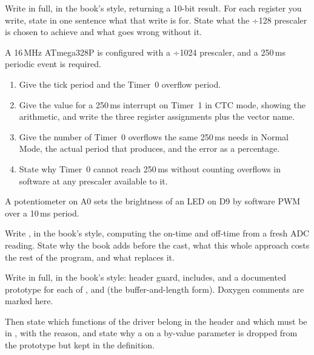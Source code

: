 \label{exb:q:4}

 Write  in full, in the book's style, returning a 10-bit
result. For each register you write, state in one sentence what that write is for. State what the
÷128 prescaler is chosen to achieve and what goes wrong without it. 

 A 16\,MHz ATmega328P is configured with a ÷1024 prescaler, and a 250\,ms periodic event is
required.
\begin{enumerate}
  \item Give the tick period and the Timer~0 overflow period.
  \item Give the  value for a 250\,ms interrupt on Timer~1 in CTC mode, showing the
    arithmetic, and write the three register assignments plus the vector name.
  \item Give the number of Timer~0 overflows the same 250\,ms needs in Normal Mode, the actual
    period that produces, and the error as a percentage.
  \item State why Timer~0 cannot reach 250\,ms without counting overflows in software at any
    prescaler available to it.
\end{enumerate}
\noindent{}

 A potentiometer on A0 sets the brightness of an LED on D9 by software PWM over a 10\,ms
period.

Write , in the book's style, computing the on-time and off-time from a fresh
ADC reading. State why the book adds  before the cast, what this whole approach costs
the rest of the program, and what replaces it. 

\label{exb:q:5}

 Write  in full, in the book's style: header guard, includes, and a
documented prototype for each of ,  and
 (the buffer-and-length form). Doxygen comments are marked here.

Then state which functions of the driver belong in the header and which must be  in
, with the reason, and state why a  on a by-value parameter is dropped
from the prototype but kept in the definition. 

